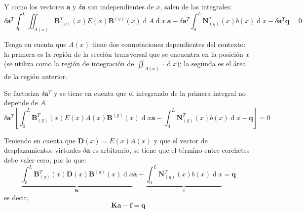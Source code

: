 \documentclass[12pt,letterpaper,landscape]{article}
\newcommand{\ve}[1]{{\boldsymbol{#1}}}
\newcommand{\ma}[1]{{\boldsymbol{#1}}}
\newcommand{\dd}{\operatorname{d} \!}
\begin{document}
Y como los vectores $\ve{a}$ y $\delta \ve{a}$  son independientes de $x$, salen de las integrales:
\begin{equation}
\delta \ve{a}^T \int_{0}^{L} \iint_{A(x)}  \ma{B}_{(g)}^T(x) E(x) \ma{B}^{(g)}(x) \dd A \dd x\ \ve{a} - \delta \ve{a}^T \int_{0}^{L}  \ma{N}_{(g)}^T(x) b(x) \dd x 
- \delta \ma{a}^T \ma{q} = 0
\end{equation}

Tenga en cuenta que $A(x)$ tiene dos connotaciones dependientes del contexto: la primera es la región de la sección transversal que se encuentra en la posición $x$ (se utiliza como la región de integración de $\iint_{A(x)} \cdot \dd x$); la segunda es el área de la región anterior. 

Se factoriza $\delta \ma{a}^T$ y se tiene en cuenta que el integrando de la primera integral no depende de $A$
\begin{equation}
\delta \ve{a}^T 
\left[ \int_{0}^{L} \ma{B}_{(g)}^T(x) E(x) A(x) \ma{B}^{(g)}(x) \dd x \ve{a}
%
- \int_{0}^{L}  \ma{N}_{(g)}^T(x) b(x) \dd x 
- \ma{q}\right] = 0
\end{equation}

Teniendo en cuenta que $\ma{D}(x) = E(x) A(x)$ y que el vector de desplazamientos virtuales $\delta \ma{a}$ es arbitrario, se tiene que el término entre corchetes debe valer cero, por lo que:
\begin{equation}
\underbrace{\int_{0}^{L} \ma{B}_{(g)}^T(x) \ma{D}(x) \ma{B}^{(g)}(x) \dd x}_{\ma{K}} \ve{a} 
- \underbrace{\int_{0}^{L}  \ma{N}_{(g)}^T(x) b(x) \dd x}_{\ma{f}} 
= \ma{q}
\end{equation}
es decir,
\begin{equation}
\ma{K}\ve{a} - \ma{f} = \ma{q}
\end{equation}
\end{document}
